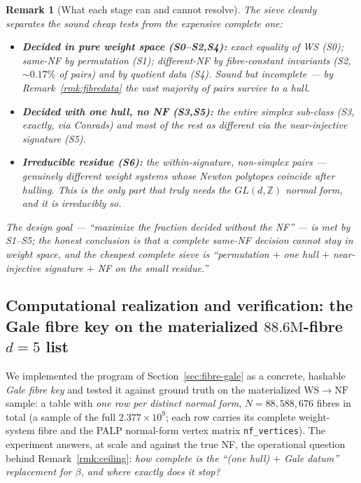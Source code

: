\documentclass{amsart}
\newtheorem{remark}[theorem]{Remark}
\begin{document}
\begin{remark}[What each stage can and cannot resolve]\label{rmk:sieveyield}
The sieve cleanly separates the sound cheap tests from the expensive complete
one:
\begin{itemize}
  \item \textbf{Decided in pure weight space (S0--S2,S4):} exact \emph{equality}
        of WS (S0); \emph{same}-NF by permutation (S1); \emph{different}-NF by
        fibre-constant invariants (S2, $\sim$$0.17\%$ of pairs) and by quotient
        data (S4). Sound but \emph{incomplete} --- by
        Remark~\ref{rmk:fibredata} the vast majority of pairs survive to a hull.
  \item \textbf{Decided with one hull, no NF (S3,S5):} the entire \emph{simplex
        sub-class} (S3, exactly, via Conrads) and \emph{most} of the rest as
        \emph{different} via the near-injective signature (S5).
  \item \textbf{Irreducible residue (S6):} the within-signature, non-simplex
        pairs --- genuinely different weight systems whose Newton polytopes
        coincide after hulling. \emph{This is the only part that truly needs the
        $GL(d,\mathbb Z)$ normal form}, and it is irreducibly so.
\end{itemize}
The design goal --- ``maximize the fraction decided without the NF'' --- is met
by S1--S5; the honest conclusion is that a \emph{complete} same-NF decision
cannot stay in weight space, and the cheapest complete sieve is
``permutation $+$ one hull $+$ near-injective signature $+$ NF on the small
residue.''
\end{remark}

\subsection{Computational realization and verification: the Gale fibre key on
the materialized $88.6\text{M}$-fibre $d=5$ list}\label{sec:fibre-verify}

We implemented the program of Section~\ref{sec:fibre-gale} as a concrete,
hashable \emph{Gale fibre key} and tested it against ground truth on the
materialized $\mathrm{WS}\to\mathrm{NF}$ sample: a table with \emph{one row per
distinct normal form}, $N=88{,}588{,}676$ fibres in total (a sample of the full
$2.377\times10^{9}$; each row carries its complete weight-system fibre and the
PALP normal-form vertex matrix \texttt{nf\_vertices}). The experiment answers, at
scale and against the true NF, the operational question behind
Remark~\ref{rmk:ceiling}: \emph{how complete is the ``(one hull) $+$ Gale
datum'' replacement for $\beta$, and where exactly does it stop?}
\end{document}
